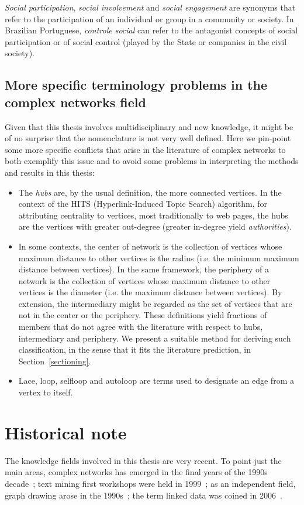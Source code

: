 \emph{Social participation}, \emph{social involvement} and \emph{social engagement} are synonyms that
refer to the participation of an individual or group in a community or society.
In Brazilian Portuguese, \emph{controle social} can refer to the antagonist concepts of social participation
or of social control (played by the State or companies in the civil society).

\subsection{More specific terminology problems in the complex networks field}
Given that this thesis involves multidisciplinary and new knowledge,
it might be of no surprise that the nomenclature is not very well defined.
Here we pin-point some more specific conflicts that arise in the literature of complex networks
to both exemplify this issue and to avoid some problems in interpreting the
methods and results in this thesis:


\begin{itemize}
\item The \emph{hubs} are, by the usual definition, the more connected vertices.
In the context of the HITS (Hyperlink-Induced Topic Search) algorithm,
for attributing centrality to vertices, most traditionally to web pages,
the hubs are the vertices with greater out-degree
(greater in-degree yield \emph{authorities}).
\item In some contexts, the center of network is the collection of vertices whose 
maximum distance to other vertices is the radius (i.e. the minimum maximum distance between vertices). 
In the same framework, the periphery of a network is the collection of vertices whose
maximum distance to other vertices is the diameter (i.e. the maximum distance between vertices).
By extension, the intermediary might be regarded as the set of vertices that are not in the center or the periphery.
These definitions yield fractions of members that do not agree with the literature with respect to hubs, intermediary and periphery.
We present a suitable method for deriving such classification, in the sense that it fits the literature prediction, in Section~\ref{sectioning}.
\item Lace, loop, selfloop and autoloop are terms used to designate an edge from a vertex to itself.
\end{itemize}

\section{Historical note}
The knowledge fields involved in this thesis are very recent.
To point just the main areas,
complex networks has emerged in the final years of the 1990s decade~\cite{newmanBook};
text mining first workshops were held in 1999~\cite{textMining};
as an independent field, graph drawing arose in the 1990s~\cite{dynGraph};
the term linked data was coined in 2006~\cite{lee1}.

